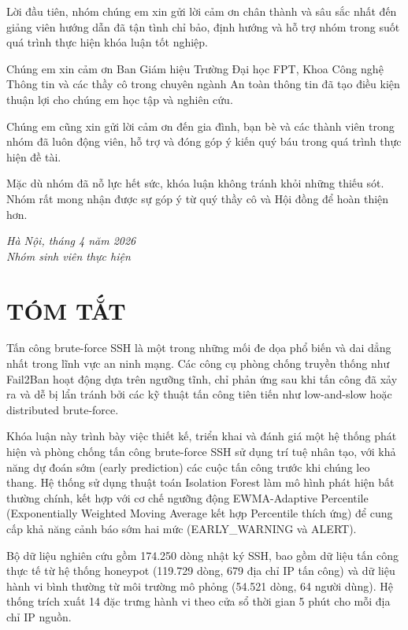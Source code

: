 \documentclass[13pt,a4paper,oneside]{report}
\begin{document}
Lời đầu tiên, nhóm chúng em xin gửi lời cảm ơn chân thành và sâu sắc nhất đến giảng viên hướng dẫn đã tận tình chỉ bảo, định hướng và hỗ trợ nhóm trong suốt quá trình thực hiện khóa luận tốt nghiệp.

Chúng em xin cảm ơn Ban Giám hiệu Trường Đại học FPT, Khoa Công nghệ Thông tin và các thầy cô trong chuyên ngành An toàn thông tin đã tạo điều kiện thuận lợi cho chúng em học tập và nghiên cứu.

Chúng em cũng xin gửi lời cảm ơn đến gia đình, bạn bè và các thành viên trong nhóm đã luôn động viên, hỗ trợ và đóng góp ý kiến quý báu trong quá trình thực hiện đề tài.

Mặc dù nhóm đã nỗ lực hết sức, khóa luận không tránh khỏi những thiếu sót. Nhóm rất mong nhận được sự góp ý từ quý thầy cô và Hội đồng để hoàn thiện hơn.

\vspace{1cm}
\begin{flushright}
\textit{Hà Nội, tháng 4 năm 2026}\\
\textit{Nhóm sinh viên thực hiện}
\end{flushright}

\chapter*{TÓM TẮT}

Tấn công brute-force SSH là một trong những mối đe dọa phổ biến và dai dẳng nhất trong lĩnh vực an ninh mạng. Các công cụ phòng chống truyền thống như Fail2Ban hoạt động dựa trên ngưỡng tĩnh, chỉ phản ứng sau khi tấn công đã xảy ra và dễ bị lẩn tránh bởi các kỹ thuật tấn công tiên tiến như low-and-slow hoặc distributed brute-force.

Khóa luận này trình bày việc thiết kế, triển khai và đánh giá một hệ thống phát hiện và phòng chống tấn công brute-force SSH sử dụng trí tuệ nhân tạo, với khả năng dự đoán sớm (early prediction) các cuộc tấn công trước khi chúng leo thang. Hệ thống sử dụng thuật toán Isolation Forest làm mô hình phát hiện bất thường chính, kết hợp với cơ chế ngưỡng động EWMA-Adaptive Percentile (Exponentially Weighted Moving Average kết hợp Percentile thích ứng) để cung cấp khả năng cảnh báo sớm hai mức (EARLY\_WARNING và ALERT).

Bộ dữ liệu nghiên cứu gồm 174.250 dòng nhật ký SSH, bao gồm dữ liệu tấn công thực tế từ hệ thống honeypot (119.729 dòng, 679 địa chỉ IP tấn công) và dữ liệu hành vi bình thường từ môi trường mô phỏng (54.521 dòng, 64 người dùng). Hệ thống trích xuất 14 đặc trưng hành vi theo cửa sổ thời gian 5 phút cho mỗi địa chỉ IP nguồn.
\end{document}
